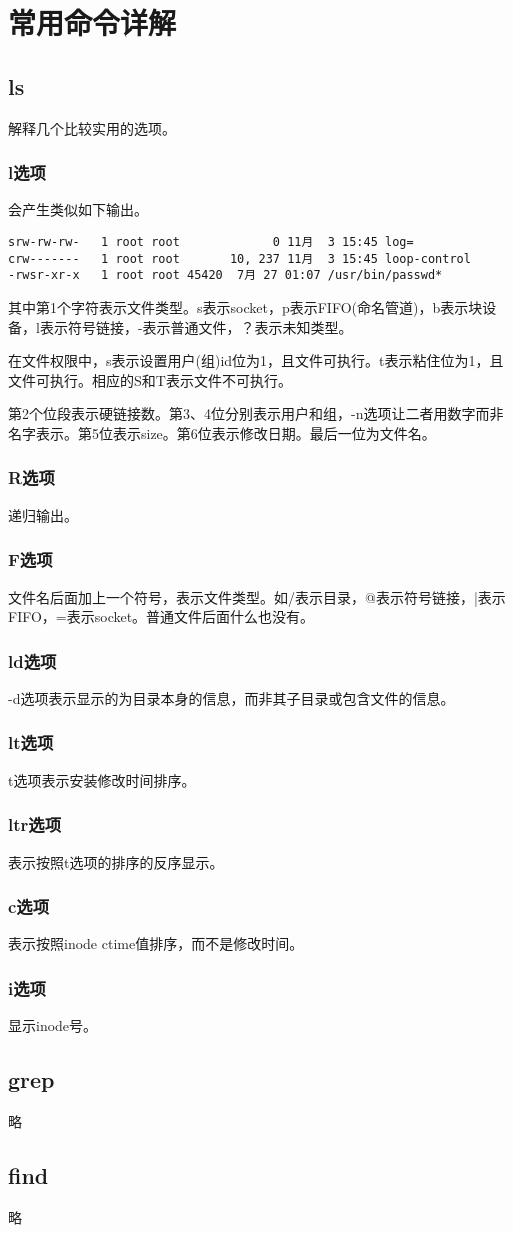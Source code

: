 \section{常用命令详解}

\subsection{ls}
解释几个比较实用的选项。

\subsubsection{l选项}
会产生类似如下输出。
\begin{verbatim}
srw-rw-rw-   1 root root             0 11月  3 15:45 log=
crw-------   1 root root       10, 237 11月  3 15:45 loop-control
-rwsr-xr-x   1 root root 45420  7月 27 01:07 /usr/bin/passwd*
\end{verbatim}
其中第1个字符表示文件类型。s表示socket，p表示FIFO(命名管道)，b表示块设备，l表示符号链接，-表示普通文件，？表示未知类型。

在文件权限中，s表示设置用户(组)id位为1，且文件可执行。t表示粘住位为1，且文件可执行。相应的S和T表示文件不可执行。

第2个位段表示硬链接数。第3、4位分别表示用户和组，-n选项让二者用数字而非名字表示。第5位表示size。第6位表示修改日期。最后一位为文件名。

\subsubsection{R选项}
递归输出。
\subsubsection{F选项}
文件名后面加上一个符号，表示文件类型。如/表示目录，@表示符号链接，|表示FIFO，=表示socket。普通文件后面什么也没有。
\subsubsection{ld选项}
-d选项表示显示的为目录本身的信息，而非其子目录或包含文件的信息。
\subsubsection{lt选项}
t选项表示安装修改时间排序。
\subsubsection{ltr选项}
表示按照t选项的排序的反序显示。
\subsubsection{c选项}
表示按照inode ctime值排序，而不是修改时间。
\subsubsection{i选项}
显示inode号。

\subsection{grep}

略
\subsection{find}


略



